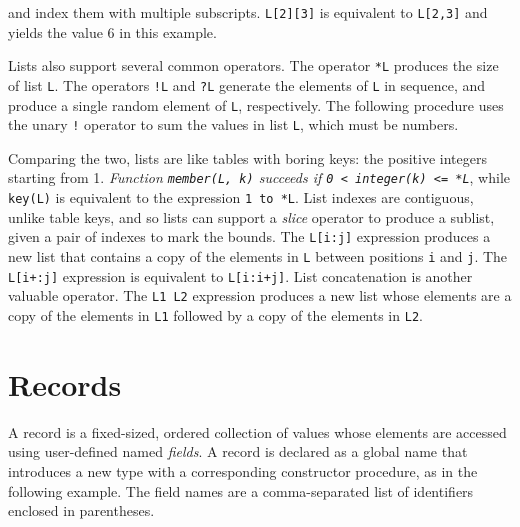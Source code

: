 \noindent and index them with multiple subscripts. \texttt{L[2][3]} is
equivalent to \texttt{L[2,3]} and yields the value 6 in this example. 

Lists also support several common operators. The operator
\texttt{*L} produces the size of list \texttt{L}.
The operators \texttt{!L} and \texttt{?L} generate the elements of
\texttt{L} in sequence, and produce a single random element of
\texttt{L}, respectively. The following procedure uses the unary
\texttt{!} operator to sum the values in list \texttt{L}, which must be
numbers.


Comparing the two, lists are like tables with boring keys: the
positive integers starting from 1. {\em Function \texttt{member(L, k)}
succeeds if \texttt{0 {\textless} integer(k) {\textless}= *L}\/}, while
\texttt{key(L)} is equivalent to the expression \texttt{1 to *L}. List
indexes are contiguous, unlike table keys, and so lists can support a
\textit{slice} operator to produce a sublist,
given a pair of indexes to mark the bounds. The \texttt{L[i:j]}
expression produces a new list that contains a copy of the elements in
\texttt{L} between positions \texttt{i} and \texttt{j}. The
\texttt{L[i+:j]} expression is equivalent to \texttt{L[i:i+j]}. List
concatenation is another valuable operator. The \texttt{L1
{\textbar}{\textbar}{\textbar} L2} expression produces a new list whose
elements are a copy of the elements in \texttt{L1} followed by a copy
of the elements in \texttt{L2}.

\section{Records}

A record is a fixed-sized, ordered collection of values
whose elements are accessed using user-defined named \textit{fields}. A
record is declared as a global name that introduces a new type with a
corresponding constructor procedure, as in
the following example. The field names are a comma-separated list of
identifiers enclosed in parentheses.

